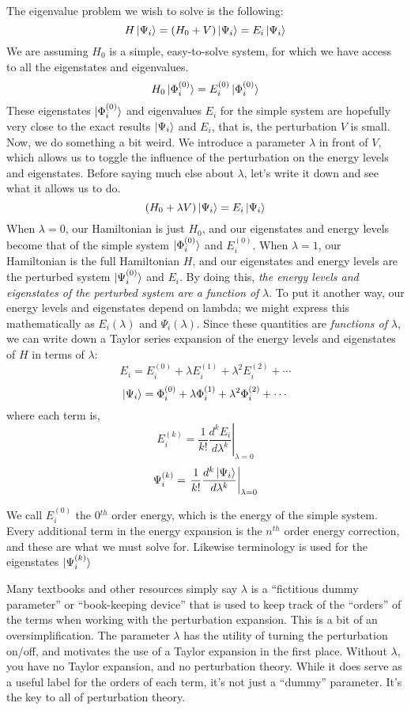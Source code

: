 \documentclass{article}
\newcommand{\lam}{\lambda}
\begin{document}
The eigenvalue problem we wish to solve is the following:
\[H \ket{\Psi_i} = (H_0 + V) \ket{\Psi_i} = E_i \ket{\Psi_i}\]
We are assuming $H_0$ is a simple, easy-to-solve system, for which we have access to all the eigenstates 
    and eigenvalues.
\[H_0 \ket{\Phi_i^{(0)}} = E_i^{(0)} \ket{\Phi_i^{(0)}} \]
These eigenstates $\ket{\Phi_i^{(0)}}$ and eigenvalues $E_i$ for the simple system are hopefully very close
    to the exact results  $\ket{\Psi_i}$ and  $E_i$, that is, the perturbation $V$ is small.
Now, we do something a bit weird.
We introduce a parameter $\lam$ in front of $V$, which allows us to toggle the influence of the
    perturbation on the energy levels and eigenstates. 
Before saying much else about $\lam$, let's write it down and see what it allows us to do.
\[(H_0 +  \lam V) \ket{\Psi_i} = E_i \ket{\Psi_i}\]
When $\lam = 0$, our Hamiltonian is just $H_0$, and our eigenstates and energy levels become that 
    of the simple system $\ket{\Phi_i^{(0)}}$ and $ E_i^{(0)}$.
When $\lam = 1$, our Hamiltonian is the full Hamiltonian $H$, and our eigenstates and energy levels 
    are the perturbed system $\ket{\Psi_i^{(0)}}$ and $E_i$.
By doing this, \textit{the energy levels and eigenstates of the perturbed system are a function
    of }$\lam$.
To put it another way, our energy levels and eigenstates depend on lambda; 
    we might express this mathematically as  $E_i(\lam)$ and $\Psi_i(\lam)$.
Since these quantities are \textit{functions of} $\lam$, we can write down a Taylor series
expansion of the energy levels and eigenstates of $H$ in terms of $\lam$:
\[E_i =  E_i^{(0)} +  \lam E_i^{(1)} + \lam^2 E_i^{(2)}  + \cdots \]
\[\ket{\Psi_i} =  \Phi_i^{(0)} +  \lam \Phi_i^{(1)} + \lam^2 \Phi_i^{(2)} + \cdots \]
where each term is,  
\[ E_i^{(k)} = \left. \frac{1}{k!} \frac{d^k E_i}{d \lam^k} \right\rvert_{\lam = 0} \]
\[ \Psi_i^{(k)} = \left. \frac{1}{k!} \frac{d^k \ket{\Psi_i}}{d \lam^k} \right\rvert_{\lam = 0} \]

We call $E_i^{(0)}$ the 0$^{th}$ order energy, which is the energy of the simple system. 
Every additional term in the energy expansion is the $n^{th}$ order energy correction, 
    and these are what we must solve for.
Likewise terminology is used for the eigenstates $\ket{\Psi_i^{(k)}}$


Many textbooks and other resources simply say $\lam$ is a 
    ``fictitious dummy parameter'' or ``book-keeping device'' that is 
    used to keep track of the  ``orders'' of the terms when working with the perturbation expansion.
This is a bit of an oversimplification. The parameter $\lam$ has the utility of turning
the perturbation on/off, and motivates the use of a Taylor expansion in the first place.
Without $\lam$, you have no Taylor expansion, and no perturbation theory. 
While it does serve as a useful label for the orders of each term, it's not just a ``dummy'' parameter. 
It's the key to all of perturbation theory.
\end{document}
